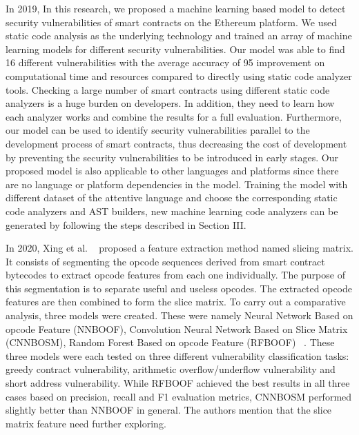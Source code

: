 In 2019, In this research, we proposed a machine learning based
model to detect security vulnerabilities of smart contracts
on the Ethereum platform. We used static code analysis as
the underlying technology and trained an array of machine
learning models for different security vulnerabilities. Our
model was able to find 16 different vulnerabilities with the
average accuracy of 95%
improvement on computational time and resources compared
to directly using static code analyzer tools. Checking a large
number of smart contracts using different static code analyzers
is a huge burden on developers. In addition, they need to learn
how each analyzer works and combine the results for a full
evaluation. Furthermore, our model can be used to identify
security vulnerabilities parallel to the development process
of smart contracts, thus decreasing the cost of development
by preventing the security vulnerabilities to be introduced
in early stages. Our proposed model is also applicable to
other languages and platforms since there are no language
or platform dependencies in the model. Training the model
with different dataset of the attentive language and choose
the corresponding static code analyzers and AST builders,
new machine learning code analyzers can be generated by
following the steps described in Section III.

In 2020, Xing et al. ~\cite{xing2020new} proposed a feature extraction method named slicing matrix.
It consists of segmenting the opcode sequences derived from
smart contract bytecodes to extract opcode features from each one individually.
The purpose of this segmentation is to separate useful and useless opcodes.
The extracted opcode features are then combined to form the slice matrix.
To carry out a comparative analysis, three models were created.
These were namely Neural Network Based on opcode Feature (NNBOOF), Convolution Neural Network Based on Slice Matrix (CNNBOSM), Random Forest Based on opcode Feature
(RFBOOF) ~\cite{hu2021comprehensive}.
These three models were each tested on three different vulnerability classification tasks: greedy contract vulnerability, arithmetic overflow/underflow vulnerability and short address vulnerability.
While RFBOOF achieved the best results in all three cases based on precision, recall and F1 evaluation metrics, CNNBOSM performed slightly better than NNBOOF in general.
The authors mention that the slice matrix feature need further exploring.


